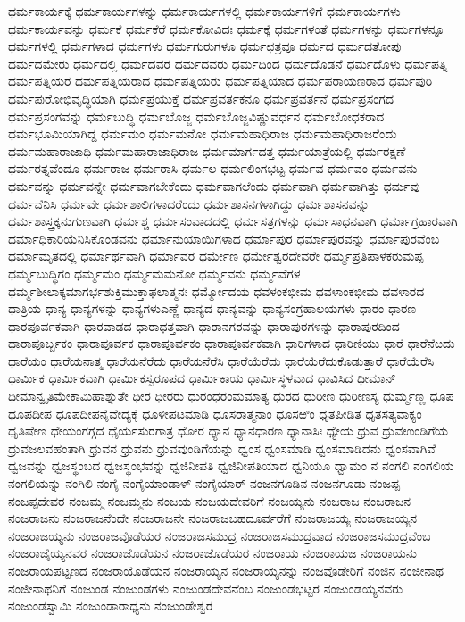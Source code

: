 {ಧರ್ಮಕಾರ್ಯಕ್ಕೆ
ಧರ್ಮಕಾರ್ಯಗಳನ್ನು
ಧರ್ಮಕಾರ್ಯಗಳಲ್ಲಿ
ಧರ್ಮಕಾರ್ಯಗಳಿಗೆ
ಧರ್ಮಕಾರ್ಯಗಳು
ಧರ್ಮಕಾರ್ಯವನ್ನು
ಧರ್ಮಕೆ
ಧರ್ಮಕೆರೆ
ಧರ್ಮಕೋವಿದಃ
ಧರ್ಮಕ್ಕೆ
ಧರ್ಮಗಳಂತೆ
ಧರ್ಮಗಳನ್ನು
ಧರ್ಮಗಳನ್ನೂ
ಧರ್ಮಗಳಲ್ಲಿ
ಧರ್ಮಗಳಾದ
ಧರ್ಮಗಳು
ಧರ್ಮಗುರುಗಳೂ
ಧರ್ಮಛತ್ರವೂ
ಧರ್ಮದ
ಧರ್ಮದತೋಪು
ಧರ್ಮದಮೇರು
ಧರ್ಮದಲ್ಲಿ
ಧರ್ಮದವರ
ಧರ್ಮದವರು
ಧರ್ಮದಿಂದ
ಧರ್ಮದೊಡನೆ
ಧರ್ಮದೊಳು
ಧರ್ಮಪತ್ನಿ
ಧರ್ಮಪತ್ನಿಯರ
ಧರ್ಮಪತ್ನಿಯರಾದ
ಧರ್ಮಪತ್ನಿಯರು
ಧರ್ಮಪತ್ನಿಯಾದ
ಧರ್ಮಪರಾಯಣರಾದ
ಧರ್ಮಪುರಿ
ಧರ್ಮಪುರೋಭಿವೃದ್ಧಿಯಾಗಿ
ಧರ್ಮಪ್ರಯುಕ್ತೆ
ಧರ್ಮಪ್ರವರ್ತಕನೂ
ಧರ್ಮಪ್ರವರ್ತನೆ
ಧರ್ಮಪ್ರಸಂಗದ
ಧರ್ಮಪ್ರಸಂಗವನ್ನು
ಧರ್ಮಬುದ್ಧಿ
ಧರ್ಮಬೊಜ್ಜ
ಧರ್ಮಬೊಜ್ಜವಿಷ್ಣುವರ್ಧನ
ಧರ್ಮಬೋಧಕರಾದ
ಧರ್ಮಭೂಮಿಯಾಗಿದ್ದ
ಧರ್ಮಮಂ
ಧರ್ಮಮನೋ
ಧರ್ಮಮಹಾಧಿರಾಜ
ಧರ್ಮಮಹಾಧಿರಾಜರೆಂದು
ಧರ್ಮಮಹಾರಾಜಾಧಿ
ಧರ್ಮಮಹಾರಾಜಾಧಿರಾಜ
ಧರ್ಮಮಾರ್ಗದತ್ತ
ಧರ್ಮಯಾತ್ರೆಯಲ್ಲಿ
ಧರ್ಮರಕ್ಷಣೆ
ಧರ್ಮರತ್ನವೆಂದೂ
ಧರ್ಮರಾಜ
ಧರ್ಮರಾಸಿ
ಧರ್ಮಲ
ಧರ್ಮಲಿಂಗಭಟ್ಟ
ಧರ್ಮವ
ಧರ್ಮವಂ
ಧರ್ಮವನು
ಧರ್ಮವನ್ನು
ಧರ್ಮವನ್ನೇ
ಧರ್ಮವಾಗಬೇಕೆಂದು
ಧರ್ಮವಾಗಲೆಂದು
ಧರ್ಮವಾಗಿ
ಧರ್ಮವಾಗಿತ್ತು
ಧರ್ಮವು
ಧರ್ಮವೆನಿಸಿ
ಧರ್ಮವೇ
ಧರ್ಮಶಾಲಿಗಳಾದರೆಂದು
ಧರ್ಮಶಾಸನಗಳಾಗಿದ್ದು
ಧರ್ಮಶಾಸನವನ್ನು
ಧರ್ಮಶಾಸ್ತ್ರಕ್ಕನುಗುಣವಾಗಿ
ಧರ್ಮಶ್ಚ
ಧರ್ಮಸಂವಾದದಲ್ಲಿ
ಧರ್ಮಸತ್ರಗಳನ್ನು
ಧರ್ಮಸಾಧನವಾಗಿ
ಧರ್ಮಾಗ್ರಹಾರವಾಗಿ
ಧರ್ಮಾಧಿಕಾರಿಯೆನಿಸಿಕೊಂಡವನು
ಧರ್ಮಾನುಯಾಯಿಗಳಾದ
ಧರ್ಮಾಪುರ
ಧರ್ಮಾಪುರವನ್ನು
ಧರ್ಮಾಪುರವೆಂಬ
ಧರ್ಮಾಮೃತದಲ್ಲಿ
ಧರ್ಮಾರ್ಥವಾಗಿ
ಧರ್ಮಾವರ
ಧರ್ಮೇಣ
ಧರ್ಮೇಶ್ವರದೇವರೇ
ಧರ್ಮ್ಮಪ್ರತಿಪಾಳಕರುಮಪ್ಪ
ಧರ್ಮ್ಮಬುದ್ಧಿಗಂ
ಧರ್ಮ್ಮಮಂ
ಧರ್ಮ್ಮಮಮನೋ
ಧರ್ಮ್ಮವನು
ಧರ್ಮ್ಮವೆಗಳ
ಧರ್ಮ್ಮಶೀಲಾಕ್ಕಮಾಗರ್ಭಶುಕ್ತಿಮುಕ್ತಾಫಲಾತ್ಮನಃ
ಧರ್ಮ್ಮೋದಯ
ಧವಳಂಕಭೀಮ
ಧವಳಾಂಕಭೀಮ
ಧವಳಾರದ
ಧಾತ್ರಿಯ
ಧಾನ್ಯ
ಧಾನ್ಯಗಳನ್ನು
ಧಾನ್ಯಗಳುಎಣ್ಣೆ
ಧಾನ್ಯದ
ಧಾನ್ಯವನ್ನು
ಧಾನ್ಯಸಂಗ್ರಹಾಲಯಗಳು
ಧಾರಂ
ಧಾರಣ
ಧಾರಪೂರ್ವಕವಾಗಿ
ಧಾರವಾಡದ
ಧಾರಾಧತ್ತವಾಗಿ
ಧಾರಾನಗರವನ್ನು
ಧಾರಾಪುರಗಳನ್ನು
ಧಾರಾಪುರದಿಂದ
ಧಾರಾಪೂರ್ಬ್ಬಕಂ
ಧಾರಾಪೂರ್ವಕ
ಧಾರಾಪೂರ್ವಕಂ
ಧಾರಾಪೂರ್ವಕವಾಗಿ
ಧಾರಿಗಳಾದ
ಧಾರಿಣಿಯು
ಧಾರೆ
ಧಾರೆನೆಱದು
ಧಾರೆಯಂ
ಧಾರೆಯನಾತ್ಮ
ಧಾರೆಯನೆರೆದು
ಧಾರೆಯನೆರೆಸಿ
ಧಾರೆಯೆರೆದು
ಧಾರೆಯೆರೆದುಕೊಡುತ್ತಾರೆ
ಧಾರೆಯೆರೆಸಿ
ಧಾರ್ಮಿಕ
ಧಾರ್ಮಿಕವಾಗಿ
ಧಾರ್ಮಿಕಸ್ವರೂಪದ
ಧಾರ್ಮಿಕಾಯ
ಧಾರ್ಮಿಸ್ಥಳವಾದ
ಧಾವಿಸಿದ
ಧೀಮಾನ್
ಧೀಮಾನ್ವೃತಿಮೇಕಾಮಿಹಾಶ್ನುತೇ
ಧೀರ
ಧೀರರು
ಧುರಂಧರಂಮಮಾತ್ಯ
ಧುರದ
ಧುರೀಣ
ಧುರೀಣಸ್ಯ
ಧುರ್ಮ್ಮಣ್ಣ
ಧೂಪ
ಧೂಪದೀಪ
ಧೂಪದೀಪನೈವೇದ್ಯಕ್ಕೆ
ಧೂಳೀಪಟಮಾಡಿ
ಧೂಸರಾತ್ಮನಾಂ
ಧೂಸಱಿಂ
ಧೃತಪೀಡಿತ
ಧೃತಸತ್ಯವಾಕ್ಯಂ
ಧೃತಿಷೇಣ
ಧೇಯಂಗಗ್ಗದ
ಧೈರ್ಯಸುರಗಾತ್ರ
ಧೋರ
ಧ್ಯಾನ
ಧ್ಯಾನಧಾರಣ
ಧ್ಯಾನಾಸಿಃ
ಧ್ಯೇಯ
ಧ್ರುವ
ಧ್ರುವಉಂಡಿಗೆಯ
ಧ್ರುವಜಲವಹಂತಾಗಿ
ಧ್ರುವನ
ಧ್ರುವನು
ಧ್ರುವವುಂಡಿಗೆಯನ್ನು
ಧ್ವಂಸ
ಧ್ವಂಸಮಾಡಿ
ಧ್ವಂಸಮಾಡಿದನು
ಧ್ವಂಸವಾಗಿವೆ
ಧ್ವಜವನ್ನು
ಧ್ವಜಸ್ಥಂಬದ
ಧ್ವಜಸ್ಥಂಭವನ್ನು
ಧ್ವಜಿನೀಪತಿ
ಧ್ವಜಿನೀಪತಿಯಾದ
ಧ್ವನಿಯೂ
ಧ್ವಾಮಂ
ನ
ನಂಗಲಿ
ನಂಗಲಿಯ
ನಂಗಲಿಯನ್ನು
ನಂಗಿಲಿ
ನಂಗೈ
ನಂಗೈಯಾಂಡಾಳ್
ನಂಗೈಯಾರ್
ನಂಜನಗೂಡಿನ
ನಂಜನಗೂಡು
ನಂಜಪ್ಪ
ನಂಜಪ್ಪದೇವರ
ನಂಜಮ್ಮ
ನಂಜಮ್ಮನು
ನಂಜಯ
ನಂಜಯದೇವರಿಗೆ
ನಂಜಯ್ಯನು
ನಂಜರಾಜ
ನಂಜರಾಜನ
ನಂಜರಾಜನು
ನಂಜರಾಜನೆಂದೇ
ನಂಜರಾಜನೇ
ನಂಜರಾಜಬಹದೂರ್ವರೆಗೆ
ನಂಜರಾಜಯ್ಯ
ನಂಜರಾಜಯ್ಯನ
ನಂಜರಾಜಯ್ಯನು
ನಂಜರಾಜವೊಡೆಯರ
ನಂಜರಾಜಸಮುದ್ರ
ನಂಜರಾಜಸಮುದ್ರವಾದ
ನಂಜರಾಜಸಮುದ್ರವೆಂಬ
ನಂಜರಾಜೈಯ್ಯನವರ
ನಂಜರಾಜೊಡೆಯನ
ನಂಜರಾಜೊಡೆಯರ
ನಂಜರಾಯ
ನಂಜರಾಯಜ
ನಂಜರಾಯನು
ನಂಜರಾಯಪಟ್ಟಣದ
ನಂಜರಾಯೊಡೆಯನ
ನಂಜರಾಯ್ಯನ
ನಂಜರಾಯ್ಯನನ್ನು
ನಂಜವೊಡೇರಿಗೆ
ನಂಜಿನ
ನಂಜೀನಾಥ
ನಂಜೀನಾಥನಿಗೆ
ನಂಜುಂಡ
ನಂಜುಂಡಗಳು
ನಂಜುಂಡದೇವನೆಂಬ
ನಂಜುಂಡಭಟ್ಟರ
ನಂಜುಂಡಯ್ಯನವರು
ನಂಜುಂಡಸ್ವಾಮಿ
ನಂಜುಂಡಾರಾಧ್ಯನು
ನಂಜುಂಡೇಶ್ವರ
}
